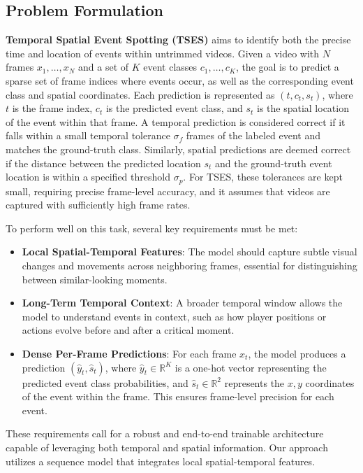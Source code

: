 \documentclass[a4paper,twoside]{article}
\begin{document}
\subsection{Problem Formulation}
\textbf{Temporal Spatial Event Spotting (TSES)} aims to identify both the precise time and location of events within untrimmed videos. Given a video with \(N\) frames \(x_1, \ldots, x_N\) and a set of \(K\) event classes \(c_1, \ldots, c_K\), the goal is to predict a sparse set of frame indices where events occur, as well as the corresponding event class and spatial coordinates. Each prediction is represented as \((t, c_t, s_t)\), where \(t\) is the frame index, \(c_t\) is the predicted event class, and \(s_t\) is the spatial location of the event within that frame. A temporal prediction is considered correct if it falls within a small temporal tolerance \(\sigma_f\) frames of the labeled event and matches the ground-truth class. Similarly, spatial predictions are deemed correct if the distance between the predicted location \(s_t\) and the ground-truth event location is within a specified threshold \(\sigma_p\). For TSES, these tolerances are kept small, requiring precise frame-level accuracy, and it assumes that videos are captured with sufficiently high frame rates.

To perform well on this task, several key requirements must be met:
\begin{itemize}
    \item \textbf{Local Spatial-Temporal Features}: The model should capture subtle visual changes and movements across neighboring frames, essential for distinguishing between similar-looking moments.
    \item \textbf{Long-Term Temporal Context}: A broader temporal window allows the model to understand events in context, such as how player positions or actions evolve before and after a critical moment.
    \item \textbf{Dense Per-Frame Predictions}: For each frame \(x_t\), the model produces a prediction \((\hat{y}_t, \hat{s}_t)\), where \(\hat{y}_t \in \mathbb{R}^K\) is a one-hot vector representing the predicted event class probabilities, and \(\hat{s}_t \in \mathbb{R}^2\) represents the \(x, y\) coordinates of the event within the frame. This ensures frame-level precision for each event.
\end{itemize}

These requirements call for a robust and end-to-end trainable architecture capable of leveraging both temporal and spatial information. Our approach utilizes a sequence model that integrates local spatial-temporal features.
\end{document}
